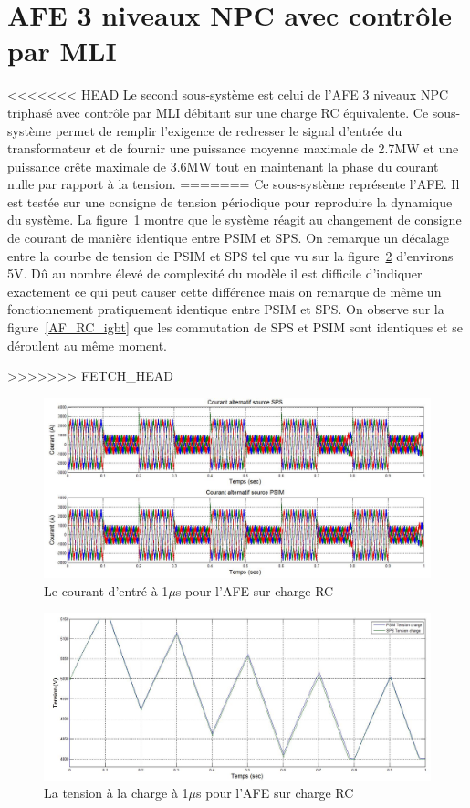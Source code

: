 \section{AFE 3 niveaux NPC avec contrôle par MLI}
<<<<<<< HEAD
Le second sous-système est celui de l'AFE 3 niveaux NPC triphasé avec contrôle par MLI débitant sur une charge RC équivalente. Ce sous-système permet de remplir l'exigence de redresser le signal d'entrée du transformateur et de fournir une puissance moyenne maximale de 2.7MW et une puissance crête maximale de 3.6MW tout en maintenant la phase du courant nulle par rapport à la tension.
=======
Ce sous-système représente l'AFE. Il est testée sur une consigne de tension périodique pour reproduire la dynamique du système. La figure~\ref{AF_RC_cou} montre que le système réagit au changement de consigne de courant de manière identique entre PSIM et SPS. On remarque un décalage entre la courbe de tension de PSIM et SPS tel que vu sur la figure~\ref{AF_RC_ten} d'environs 5V. Dû au nombre élevé de complexité du modèle il est difficile d'indiquer exactement ce qui peut causer cette différence mais on remarque de même un fonctionnement pratiquement identique entre PSIM et SPS. On observe sur la figure~\ref{AF_RC_igbt} que les commutation de SPS et PSIM sont identiques et se déroulent au même moment.


>>>>>>> FETCH_HEAD
\begin{figure}[htb]
\centering
\includegraphics[scale=0.5]{fig/coual_afe.jpg}
\caption{Le courant d'entré à 1$\mu$s pour l'AFE sur charge RC}
\label{AF_RC_cou}
\end{figure}




\begin{figure}[htb]
\centering
\includegraphics[scale=0.5]{fig/ten_afe.jpg}
\caption{La tension à la charge à 1$\mu$s pour l'AFE sur charge RC}
\label{AF_RC_ten}
\end{figure}



